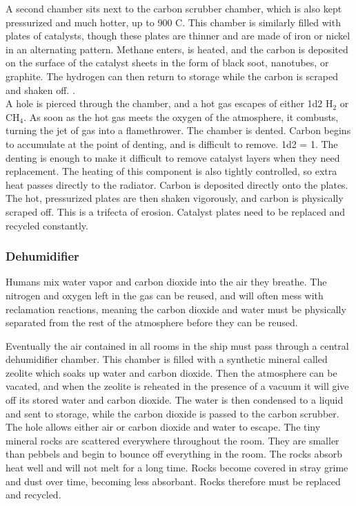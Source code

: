 \documentclass[a4paper]{article}
\begin{document}
A second chamber sits next to the carbon scrubber chamber, which is also kept pressurized and much hotter, up to 900 \degree C. This chamber is similarly filled with plates of catalysts, though these plates are thinner and are made of iron or nickel in an alternating pattern. Methane enters, is heated, and the carbon is deposited on the surface of the catalyst sheets in the form of black soot, nanotubes, or graphite. The hydrogen can then return to storage while the carbon is scraped and shaken off. \cite{hydrogen_recapture}. 
\\ \pbhw
{A hole is pierced through the chamber, and a hot gas escapes of either 1d2 H$_2$ or CH$_4$. As soon as the hot gas meets the oxygen of the atmosphere, it combusts, turning the jet of gas into a flamethrower.}
{The chamber is dented. Carbon begins to accumulate at the point of denting, and is difficult to remove. \newline 1d2 = 1. The denting is enough to make it difficult to remove catalyst layers when they need replacement. }
{The heating of this component is also tightly controlled, so extra heat passes directly to the radiator.}
{Carbon is deposited directly onto the plates. The hot, pressurized plates are then shaken vigorously, and carbon is physically scraped off. This is a trifecta of erosion. Catalyst plates need to be replaced and recycled constantly.}


\vspace{-0.5cm} \hspace{-18pt} \subsubsection{Dehumidifier} \label{life_dehumidifier} \vspace{-0.2cm}
Humans mix water vapor and carbon dioxide into the air they breathe. The nitrogen and oxygen left in the gas can be reused, and will often mess with reclamation reactions, meaning the carbon dioxide and water must be physically separated from the rest of the atmosphere before they can be reused.

Eventually the air contained in all rooms in the ship must pass through a central dehumidifier chamber. This chamber is filled with a synthetic mineral called zeolite which soaks up water and carbon dioxide. Then the atmosphere can be vacated, and when the zeolite is reheated in the presence of a vacuum it will give off its stored water and carbon dioxide. The water is then condensed to a liquid and sent to storage, while the carbon dioxide is passed to the carbon scrubber.
\\ \pbhw
{The hole allows either air or carbon dioxide and water to escape.}
{The tiny mineral rocks are scattered everywhere throughout the room. They are smaller than pebbels and begin to bounce off everything in the room.}
{The rocks absorb heat well and will not melt for a long time.}
{Rocks become covered in stray grime and dust over time, becoming less absorbant. Rocks therefore must be replaced and recycled.}
\end{document}
